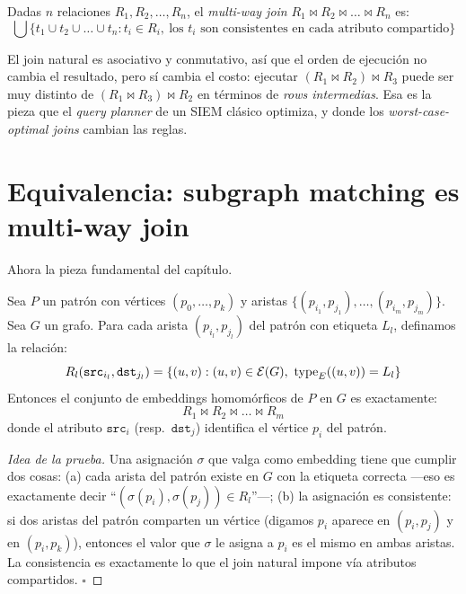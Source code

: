 \begin{definition}
Dadas \(n\) relaciones \(R_1, R_2, \dots, R_n\), el \emph{multi-way
join} \(R_1 \bowtie R_2 \bowtie \dots \bowtie R_n\) es:
\[
\bigcup \{ t_1 \cup t_2 \cup \dots \cup t_n :
    t_i \in R_i,\ \text{los \(t_i\) son consistentes en cada atributo compartido} \}
\]
\end{definition}

\noindent
El join natural es asociativo y conmutativo, así que el orden de
ejecución no cambia el resultado, pero sí cambia el costo: ejecutar
\((R_1 \bowtie R_2) \bowtie R_3\) puede ser muy distinto de
\((R_1 \bowtie R_3) \bowtie R_2\) en términos de \emph{rows
intermedias}. Esa es la pieza que el \emph{query planner} de un SIEM
clásico optimiza, y donde los \emph{worst-case-optimal joins}
cambian las reglas.

\section{Equivalencia: subgraph matching es multi-way join}

Ahora la pieza fundamental del capítulo.

\begin{theorem}
Sea \(P\) un patrón con vértices \((p_0, \dots, p_k)\) y aristas
\(\{(p_{i_1}, p_{j_1}), \dots, (p_{i_m}, p_{j_m})\}\). Sea \(G\) un
grafo. Para cada arista \((p_{i_l}, p_{j_l})\) del patrón con
etiqueta \(L_l\), definamos la relación:
\[
R_l(\texttt{src}_{i_l}, \texttt{dst}_{j_l}) =
\{(u, v) : (u, v) \in \mathcal{E}(G),\ \mathrm{type}_E((u, v)) = L_l \}
\]
Entonces el conjunto de embeddings homomórficos de \(P\) en \(G\) es
exactamente:
\[
R_1 \bowtie R_2 \bowtie \dots \bowtie R_m
\]
donde el atributo \(\texttt{src}_i\) (resp.\ \(\texttt{dst}_j\))
identifica el vértice \(p_i\) del patrón.
\end{theorem}

\begin{proof}[Idea de la prueba]
Una asignación \(\sigma\) que valga como embedding tiene que cumplir
dos cosas: (a) cada arista del patrón existe en \(G\) con la etiqueta
correcta ---eso es exactamente decir ``\((\sigma(p_i), \sigma(p_j))
\in R_l\)''---; (b) la asignación es consistente: si dos aristas del
patrón comparten un vértice (digamos \(p_i\) aparece en
\((p_i, p_j)\) y en \((p_i, p_k)\)), entonces el valor que \(\sigma\)
le asigna a \(p_i\) es el mismo en ambas aristas. La consistencia es
exactamente lo que el join natural impone vía atributos compartidos.
\(\square\)
\end{proof}

